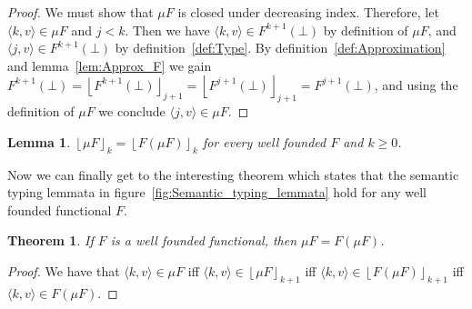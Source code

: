 \documentclass[12pt,a4paper,draft]{article}
\theoremstyle{definition}
\theoremstyle{plain}
\newtheorem{lemma}[definition]{Lemma}
\newtheorem{theorem}[definition]{Theorem}
\newcommand{\pair}[1]{\ensuremath{\langle{#1}\rangle}}
\newcommand{\floor}[1]{\ensuremath{\left\lfloor{#1}\right\rfloor}}
\begin{document}
\begin{proof}
  We must show that $\mu F$ is closed under decreasing index. Therefore, let $\pair{k,v} \in \mu F$
  and $j < k$. Then we have $\pair{k,v} \in F^{k+1}(\bot)$ by definition of $\mu F$, and
  $\pair{j,v} \in F^{k+1}(\bot)$ by definition~\ref{def:Type}. By definition~\ref{def:Approximation}
  and lemma~\ref{lem:Approx_F} we gain
  $F^{k+1}(\bot) = \floor{F^{k+1}\left(\bot\right)}_{j+1} = \floor{F^{j+1}\left(\bot\right)}_{j+1} = F^{j+1}(\bot)$,
  and using the definition of $\mu F$ we conclude $\pair{j,v} \in \mu F$.
\end{proof}

\begin{lemma}
  $\floor{\mu F}_k = \floor{F \left(\mu F\right)}_k$ for every well founded $F$ and $k \ge 0$.
\end{lemma}

Now we can finally get to the interesting theorem which states that the
semantic typing lemmata in figure~\ref{fig:Semantic_typing_lemmata} hold
for any well founded functional $F$.
\begin{theorem}
  If $F$ is a well founded functional, then $\mu F = F(\mu F)$.
\end{theorem}

\begin{proof}
  We have that $\pair{k,v} \in \mu F$ iff $\pair{k,v} \in \floor{\mu F}_{k+1}$
  iff $\pair{k,v} \in \floor{F \left(\mu F\right)}_{k+1}$ iff
  $\pair{k,v} \in F \left(\mu F\right)$.
\end{proof}
\end{document}
